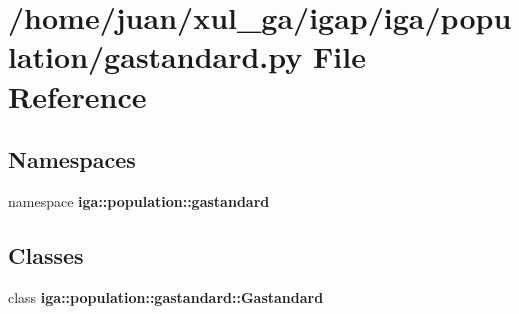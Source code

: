 \section{/home/juan/xul\_\-ga/igap/iga/population/gastandard.py File Reference}
\label{gastandard_8py}
\subsection*{Namespaces}
\begin{CompactItemize}
\item 
namespace {\bf iga::population::gastandard}
\end{CompactItemize}
\subsection*{Classes}
\begin{CompactItemize}
\item 
class {\bf iga::population::gastandard::Gastandard}
\end{CompactItemize}
